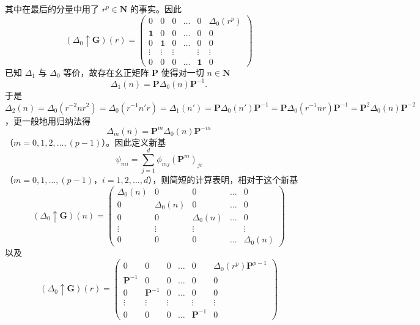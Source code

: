 其中在最后的分量中用了 $r^{p} \in \mathbf{N}$ 的事实。因此
\begin{equation*}
(\Delta_{0} \uparrow \mathbf{G})(r) = \begin{pmatrix} 0 & 0 & 0 & \dots & 0 & \Delta_{0}(r^{p})\\ \mathbf{1} & 0 & 0 & \dots & 0 & 0\\ 0 & \mathbf{1} & 0 & \dots & 0 & 0\\ \vdots & \vdots & \vdots & & \vdots & \vdots\\ 0 & 0 & 0 & \dots & \mathbf{1} & 0 \end{pmatrix}
\tag{4.5.29}
\end{equation*}
已知 $\Delta_{1}$ 与 $\Delta_{0}$ 等价，故存在幺正矩阵 $\mathbf{P}$ 使得对一切 $n \in \mathbf{N}$
\begin{equation*}
\Delta_{1}(n) = \mathbf{P}\Delta_{0}(n)\mathbf{P}^{-1}.
\tag{4.5.30}
\end{equation*}
于是 $\Delta_{2}(n) = \Delta_{0}(r^{-2}nr^{2}) = \Delta_{0}(r^{-1}n'r) = \Delta_{1}(n') = \mathbf{P}\Delta_{0}(n')\mathbf{P}^{-1} = \mathbf{P}\Delta_{0}(r^{-1}nr)\mathbf{P}^{-1} = \mathbf{P}^{2}\Delta_{0}(n)\mathbf{P}^{-2}$，更一般地用归纳法得
\begin{equation*}
\Delta_{m}(n) = \mathbf{P}^{m}\Delta_{0}(n)\mathbf{P}^{-m}
\tag{4.5.31}
\end{equation*}
（$m = 0, 1, 2, \dots, (p-1)$）。因此定义新基
\begin{equation*}
\psi_{mi} = \sum^{d}_{j=1}\phi_{mj}(\mathbf{P}^{m})_{ji}
\tag{4.5.32}
\end{equation*}
（$m = 0, 1, \dots, (p-1)$，$i = 1, 2, \dots, d$），则简短的计算表明，相对于这个新基
\begin{equation*}
(\Delta_{0} \uparrow \mathbf{G})(n) = \begin{pmatrix} \Delta_{0}(n) & 0 & 0 & \dots & 0\\ 0 & \Delta_{0}(n) & 0 & \dots & 0\\ 0 & 0 & \Delta_{0}(n) & \dots & 0\\ \vdots & \vdots & \vdots & & \vdots\\ 0 & 0 & 0 & \dots & \Delta_{0}(n) \end{pmatrix}
\tag{4.5.33}
\end{equation*}
以及
\begin{equation*}
(\Delta_{0} \uparrow \mathbf{G})(r) = \begin{pmatrix} 0 & 0 & 0 & \dots & 0 & \Delta_{0}(r^{p})\mathbf{P}^{p-1}\\ \mathbf{P}^{-1} & 0 & 0 & \dots & 0 & 0\\ 0 & \mathbf{P}^{-1} & 0 & \dots & 0 & 0\\ \vdots & \vdots & \vdots & & \vdots & \vdots\\ 0 & 0 & 0 & \dots & \mathbf{P}^{-1} & 0 \end{pmatrix}
\tag{4.5.34}
\end{equation*}
